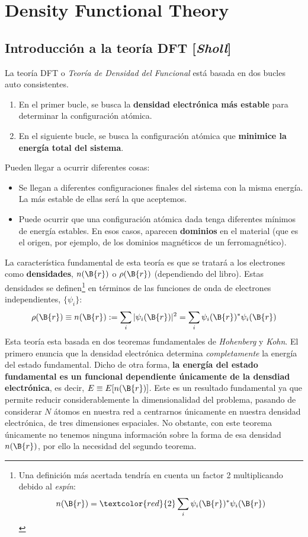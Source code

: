 \chapter[DFT]{Density Functional Theory}
\section[ITRO. DFT (SHOLL)]{Introducción a la teoría DFT [\emph{Sholl}]}

La teoría DFT o \emph{Teoría de Densidad del Funcional} está basada en dos bucles auto consistentes.
\begin{enumerate}
    \item En el primer bucle, se busca la \textbf{densidad electrónica más estable} para determinar la configuración atómica.
    \item En el siguiente bucle, se busca la configuración atómica que \textbf{minimice la energía total del sistema}.
\end{enumerate}
Pueden llegar a ocurrir diferentes cosas: 
\begin{itemize}
    \item Se llegan a diferentes configuraciones finales del sistema con la misma energía. La más estable de ellas será la que aceptemos.
    \item Puede ocurrir que una configuración atómica dada tenga diferentes mínimos de energía estables. En esos casos, aparecen \textbf{dominios} en el material (que es el origen, por ejemplo, de los dominios magnéticos de un ferromagnético).
\end{itemize}

La característica fundamental de esta teoría es que se tratará a los electrones como \textbf{densidades}, $n(\B{r})$ o $\rho(\B{r})$ (dependiendo del libro). Estas densidades se definen\footnote{Una definición más acertada tendría en cuenta un factor 2 multiplicando debido al \emph{espín}: $$n(\B{r}) = \textcolor{red}{2}\sum_i \psi_i(\B{r})^* \psi_i(\B{r})$$} en términos de las funciones de onda de electrones independientes, $\{\psi_i\}$: 
\begin{equation}
    \rho(\B{r})\equiv n(\B{r}):=\sum_i |\psi_i(\B{r})|^2 = \sum_i \psi_i(\B{r})^* \psi_i(\B{r})
\end{equation}
Esta teoría esta basada en dos teoremas fundamentales de \emph{Hohenberg} y \emph{Kohn}. El primero enuncia que la densidad electrónica determina \emph{completamente} la energía del estado fundamental. Dicho de otra forma, \textbf{la energía del estado fundamental es un funcional dependiente únicamente de la densdiad electrónica}, es decir, $E\equiv E[n(\B{r})]$. Este es un resultado fundamental ya que permite reducir considerablemente la dimensionalidad del problema, pasando de considerar $N$ átomos en nuestra red a centrarnos únicamente en nuestra densidad electrónica, de tres dimensiones espaciales. No obstante, con este teorema únicamente no tenemos ninguna información sobre la forma de esa densidad $n(\B{r})$, por ello la necesidad del segundo teorema. \\


